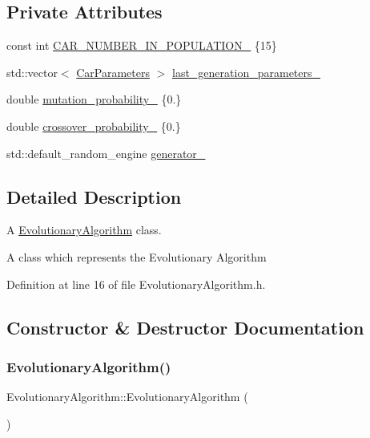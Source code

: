 \subsection*{Private Attributes}
\begin{DoxyCompactItemize}
\item 
const int \hyperlink{classEvolutionaryAlgorithm_af466ca42d5d03e212df4575f263f3a8c}{C\+A\+R\+\_\+\+N\+U\+M\+B\+E\+R\+\_\+\+I\+N\+\_\+\+P\+O\+P\+U\+L\+A\+T\+I\+O\+N\+\_\+} \{15\}
\item 
std\+::vector$<$ \hyperlink{classCarParameters}{Car\+Parameters} $>$ \hyperlink{classEvolutionaryAlgorithm_a85d23b07f2b2c8b1df581a9566111fa7}{last\+\_\+generation\+\_\+parameters\+\_\+}
\item 
double \hyperlink{classEvolutionaryAlgorithm_ab847e49664c7b97e1e55963e6f33b332}{mutation\+\_\+probability\+\_\+} \{0.\}
\item 
double \hyperlink{classEvolutionaryAlgorithm_a815be8b2644e2d1bdc6378c88ab03da3}{crossover\+\_\+probability\+\_\+} \{0.\}
\item 
std\+::default\+\_\+random\+\_\+engine \hyperlink{classEvolutionaryAlgorithm_adbd823d385ad95bf20496fd2fc25ccde}{generator\+\_\+}
\end{DoxyCompactItemize}


\subsection{Detailed Description}
A \hyperlink{classEvolutionaryAlgorithm}{Evolutionary\+Algorithm} class. 

A class which represents the Evolutionary Algorithm 

Definition at line 16 of file Evolutionary\+Algorithm.\+h.



\subsection{Constructor \& Destructor Documentation}
\mbox{\label{classEvolutionaryAlgorithm_ae93cddd09649e8077b553c09919542b4}} 
\subsubsection{\texorpdfstring{Evolutionary\+Algorithm()}{EvolutionaryAlgorithm()}\hspace{0.1cm}{\footnotesize\ttfamily [1/2]}}
{\footnotesize\ttfamily Evolutionary\+Algorithm\+::\+Evolutionary\+Algorithm (\begin{DoxyParamCaption}\item[{const \hyperlink{classEvolutionaryAlgorithm}{Evolutionary\+Algorithm} \&}]{ }\end{DoxyParamCaption})\hspace{0.3cm}{\ttfamily [delete]}}

